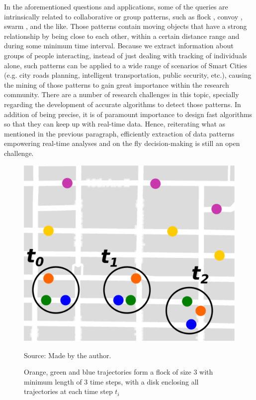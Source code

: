 In the aforementioned questions and applications, some of the queries are intrinsically related to collaborative or
group patterns, such as flock \citep{gudefficient}, convoy \citep{convoy}, swarm \citep{swarm}, and the like. Those
patterns contain moving objects that have a strong relationship by being close to each other, within a certain distance
range and during some minimum time interval. Because we extract information about groups of people interacting, instead
of just dealing with tracking of individuals alone, such patterns can be applied to a wide range of scenarios of Smart
Cities (e.g. city roads planning, intelligent transportation, public security, etc.), causing the mining of those
patterns to gain great importance within the research community. There are a number of research challenges in this
topic, specially regarding the development of accurate algorithms to detect those patterns. In addition of being
precise, it is of paramount importance to design fast algorithms so that they can keep up with real-time data. Hence,
reiterating what as mentioned in the previous paragraph, efficiently extraction of data patterns empowering real-time
analyses and on the fly decision-making is still an open challenge.

\begin{figure}[h!]
    \centering
    \caption{Orange, green and blue trajectories form a flock of size 3 with minimum length of 3 time steps, with a disk
        enclosing all trajectories at each time step $t_i$}
    \centerline{\includegraphics[width=0.7\linewidth]{images/flock_pattern.eps}}
    \footnotesize{Source: Made by the author.}
    \label{fig:flocks}
\end{figure}

